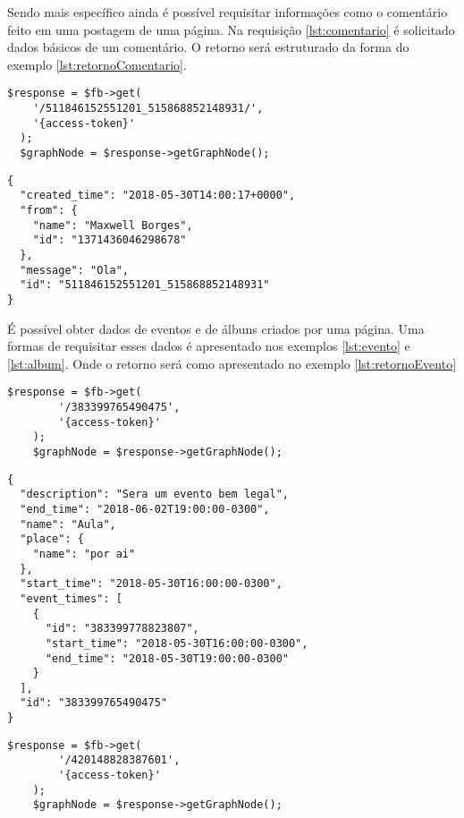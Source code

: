 Sendo mais específico ainda é possível requisitar informações como o comentário feito em uma postagem de uma página. Na requisição \ref{lst:comentario} é solicitado dados básicos de um comentário. O retorno será estruturado da forma do exemplo \ref{lst:retornoComentario}.

\begin{lstlisting}[caption={Requisitar informações de um comentário específico},label={lst:comentario}]
  $response = $fb->get(
    '/511846152551201_515868852148931/',
    '{access-token}'
  );
  $graphNode = $response->getGraphNode();
\end{lstlisting}

\begin{lstlisting}[caption={Resposta do servidor a uma requisição \ref{lst:comentario} (Comentário)},label={lst:retornoComentario}]
{
  "created_time": "2018-05-30T14:00:17+0000",
  "from": {
    "name": "Maxwell Borges",
    "id": "1371436046298678"
  },
  "message": "Ola",
  "id": "511846152551201_515868852148931"
}
\end{lstlisting}

É possível obter dados de eventos e de álbuns criados por uma página. Uma formas de requisitar esses dados é apresentado nos exemplos \ref{lst:evento} e \ref{lst:album}. Onde o retorno será como apresentado no exemplo \ref{lst:retornoEvento}

\begin{lstlisting}[caption={Requisitar uma evento específico},label={lst:evento}]
	$response = $fb->get(
    	'/383399765490475',
    	'{access-token}'
	);
	$graphNode = $response->getGraphNode();
\end{lstlisting}

\begin{lstlisting}[caption={Resposta do servidor a requisição \ref{lst:evento} (Evento)},label={lst:retornoEvento}]
{
  "description": "Sera um evento bem legal",
  "end_time": "2018-06-02T19:00:00-0300",
  "name": "Aula",
  "place": {
    "name": "por ai"
  },
  "start_time": "2018-05-30T16:00:00-0300",
  "event_times": [
    {
      "id": "383399778823807",
      "start_time": "2018-05-30T16:00:00-0300",
      "end_time": "2018-05-30T19:00:00-0300"
    }
  ],
  "id": "383399765490475"
}
\end{lstlisting}

\begin{lstlisting}[caption={Requisitar uma álbum específico},label={lst:album}]
	$response = $fb->get(
		'/420148828387601',
		'{access-token}'
	);
	$graphNode = $response->getGraphNode();
\end{lstlisting}

